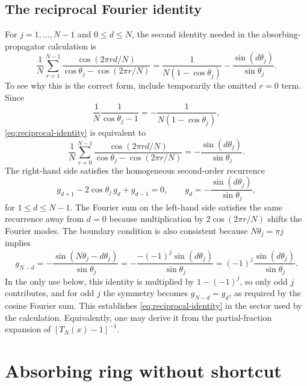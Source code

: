 \documentclass[11pt]{article}
\begin{document}
\subsection{The reciprocal Fourier identity}

For $j=1,\ldots,N-1$ and $0\leq d\leq N$, the second identity needed in the absorbing-propagator
calculation is
\begin{equation}
  \boxed{
  \frac1N\sum_{r=1}^{N-1}
  \frac{\cos(2\pi r d/N)}{\cos\theta_j-\cos(2\pi r/N)}
  =\frac{1}{N(1-\cos\theta_j)}-\frac{\sin(d\theta_j)}{\sin\theta_j}.}
  \label{eq:reciprocal-identity}
\end{equation}
To see why this is the correct form, include temporarily the omitted $r=0$ term.  Since
\begin{equation}
  \frac{1}{N}\frac{1}{\cos\theta_j-1}
  =-\frac{1}{N(1-\cos\theta_j)},
\end{equation}
\eqref{eq:reciprocal-identity} is equivalent to
\begin{equation}
  \boxed{
  \frac1N\sum_{r=0}^{N-1}
  \frac{\cos(2\pi r d/N)}{\cos\theta_j-\cos(2\pi r/N)}
  =-\frac{\sin(d\theta_j)}{\sin\theta_j}.}
  \label{eq:reciprocal-identity-full}
\end{equation}
The right-hand side satisfies the homogeneous second-order recurrence
\begin{equation}
  g_{d+1}-2\cos\theta_j\,g_d+g_{d-1}=0,
  \qquad
  g_d=-\frac{\sin(d\theta_j)}{\sin\theta_j},
  \label{eq:g-recurrence}
\end{equation}
for $1\leq d\leq N-1$.  The Fourier sum on the left-hand side satisfies the same recurrence away
from $d=0$ because multiplication by $2\cos(2\pi r/N)$ shifts the Fourier modes.  The boundary
condition is also consistent because $N\theta_j=\pi j$ implies
\begin{equation}
  g_{N-d}=-\frac{\sin(N\theta_j-d\theta_j)}{\sin\theta_j}
  =-\frac{-(-1)^j\sin(d\theta_j)}{\sin\theta_j}
  =(-1)^j\frac{\sin(d\theta_j)}{\sin\theta_j}.
\end{equation}
In the only use below, this identity is multiplied by $1-(-1)^j$, so only odd $j$ contributes,
and for odd $j$ the symmetry becomes $g_{N-d}=g_d$, as required by the cosine Fourier sum.  This
establishes \eqref{eq:reciprocal-identity} in the sector used by the calculation.  Equivalently,
one may derive it from the partial-fraction expansion of $[T_N(x)-1]^{-1}$.

\section{Absorbing ring without shortcut}
\label{sec:absorbing-ring}
\end{document}
